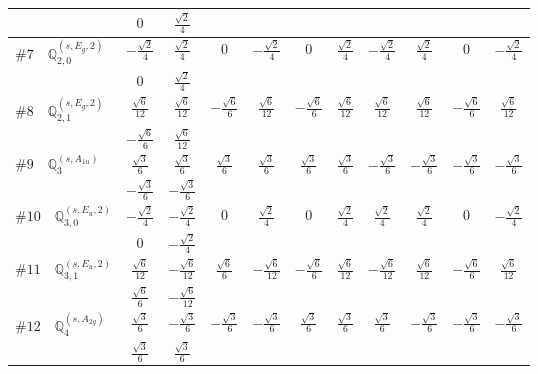 \documentclass[fleqn,9pt,landscape]{jsarticle}
\begin{document}
\begin{center}
\begin{longtable}{lcccccccccc}
& $ 0 $ & $ \frac{\sqrt{2}}{4} $ & $  $ & $  $ & $  $ & $  $ & $  $ & $  $ & $  $ & $  $ \\ \hline
$ \#7\quad \mathbb{Q}_{2,0}^{(s,E_{g},2)} $ & $ - \frac{\sqrt{2}}{4} $ & $ \frac{\sqrt{2}}{4} $ & $ 0 $ & $ - \frac{\sqrt{2}}{4} $ & $ 0 $ & $ \frac{\sqrt{2}}{4} $ & $ - \frac{\sqrt{2}}{4} $ & $ \frac{\sqrt{2}}{4} $ & $ 0 $ & $ - \frac{\sqrt{2}}{4} $ \\
& $ 0 $ & $ \frac{\sqrt{2}}{4} $ & $  $ & $  $ & $  $ & $  $ & $  $ & $  $ & $  $ & $  $ \\ \hline
$ \#8\quad \mathbb{Q}_{2,1}^{(s,E_{g},2)} $ & $ \frac{\sqrt{6}}{12} $ & $ \frac{\sqrt{6}}{12} $ & $ - \frac{\sqrt{6}}{6} $ & $ \frac{\sqrt{6}}{12} $ & $ - \frac{\sqrt{6}}{6} $ & $ \frac{\sqrt{6}}{12} $ & $ \frac{\sqrt{6}}{12} $ & $ \frac{\sqrt{6}}{12} $ & $ - \frac{\sqrt{6}}{6} $ & $ \frac{\sqrt{6}}{12} $ \\
& $ - \frac{\sqrt{6}}{6} $ & $ \frac{\sqrt{6}}{12} $ & $  $ & $  $ & $  $ & $  $ & $  $ & $  $ & $  $ & $  $ \\ \hline
$ \#9\quad \mathbb{Q}_{3}^{(s,A_{1u})} $ & $ \frac{\sqrt{3}}{6} $ & $ \frac{\sqrt{3}}{6} $ & $ \frac{\sqrt{3}}{6} $ & $ \frac{\sqrt{3}}{6} $ & $ \frac{\sqrt{3}}{6} $ & $ \frac{\sqrt{3}}{6} $ & $ - \frac{\sqrt{3}}{6} $ & $ - \frac{\sqrt{3}}{6} $ & $ - \frac{\sqrt{3}}{6} $ & $ - \frac{\sqrt{3}}{6} $ \\
& $ - \frac{\sqrt{3}}{6} $ & $ - \frac{\sqrt{3}}{6} $ & $  $ & $  $ & $  $ & $  $ & $  $ & $  $ & $  $ & $  $ \\ \hline
$ \#10\quad \mathbb{Q}_{3,0}^{(s,E_{u},2)} $ & $ - \frac{\sqrt{2}}{4} $ & $ - \frac{\sqrt{2}}{4} $ & $ 0 $ & $ \frac{\sqrt{2}}{4} $ & $ 0 $ & $ \frac{\sqrt{2}}{4} $ & $ \frac{\sqrt{2}}{4} $ & $ \frac{\sqrt{2}}{4} $ & $ 0 $ & $ - \frac{\sqrt{2}}{4} $ \\
& $ 0 $ & $ - \frac{\sqrt{2}}{4} $ & $  $ & $  $ & $  $ & $  $ & $  $ & $  $ & $  $ & $  $ \\ \hline
$ \#11\quad \mathbb{Q}_{3,1}^{(s,E_{u},2)} $ & $ \frac{\sqrt{6}}{12} $ & $ - \frac{\sqrt{6}}{12} $ & $ \frac{\sqrt{6}}{6} $ & $ - \frac{\sqrt{6}}{12} $ & $ - \frac{\sqrt{6}}{6} $ & $ \frac{\sqrt{6}}{12} $ & $ - \frac{\sqrt{6}}{12} $ & $ \frac{\sqrt{6}}{12} $ & $ - \frac{\sqrt{6}}{6} $ & $ \frac{\sqrt{6}}{12} $ \\
& $ \frac{\sqrt{6}}{6} $ & $ - \frac{\sqrt{6}}{12} $ & $  $ & $  $ & $  $ & $  $ & $  $ & $  $ & $  $ & $  $ \\ \hline
$ \#12\quad \mathbb{Q}_{4}^{(s,A_{2g})} $ & $ \frac{\sqrt{3}}{6} $ & $ - \frac{\sqrt{3}}{6} $ & $ - \frac{\sqrt{3}}{6} $ & $ - \frac{\sqrt{3}}{6} $ & $ \frac{\sqrt{3}}{6} $ & $ \frac{\sqrt{3}}{6} $ & $ \frac{\sqrt{3}}{6} $ & $ - \frac{\sqrt{3}}{6} $ & $ - \frac{\sqrt{3}}{6} $ & $ - \frac{\sqrt{3}}{6} $ \\
& $ \frac{\sqrt{3}}{6} $ & $ \frac{\sqrt{3}}{6} $ & $  $ & $  $ & $  $ & $  $ & $  $ & $  $ & $  $ & $  $ \\
\end{longtable}
\end{center}
\end{document}
